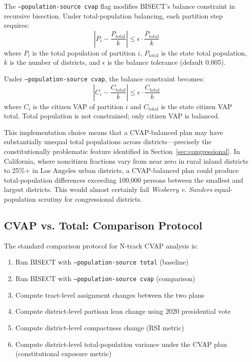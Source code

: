 The \texttt{--population-source cvap} flag modifies BISECT's balance constraint in recursive bisection. Under total-population balancing, each partition step requires:
\[
\left| P_i - \frac{P_{\text{total}}}{k} \right| \leq \epsilon \cdot \frac{P_{\text{total}}}{k}
\]
where $P_i$ is the total population of partition $i$, $P_{\text{total}}$ is the state total population, $k$ is the number of districts, and $\epsilon$ is the balance tolerance (default 0.005).

Under \texttt{--population-source cvap}, the balance constraint becomes:
\[
\left| C_i - \frac{C_{\text{total}}}{k} \right| \leq \epsilon \cdot \frac{C_{\text{total}}}{k}
\]
where $C_i$ is the citizen VAP of partition $i$ and $C_{\text{total}}$ is the state citizen VAP total. Total population is not constrained; only citizen VAP is balanced.

This implementation choice means that a CVAP-balanced plan may have substantially unequal total populations across districts---precisely the constitutionally problematic feature identified in Section~\ref{sec:congressional}. In California, where noncitizen fractions vary from near zero in rural inland districts to 25\%+ in Los Angeles urban districts, a CVAP-balanced plan could produce total-population differences exceeding 100,000 persons between the smallest and largest districts. This would almost certainly fail \emph{Wesberry v. Sanders} equal-population scrutiny for congressional districts.

\subsection{CVAP vs. Total: Comparison Protocol}

The standard comparison protocol for N-track CVAP analysis is:
\begin{enumerate}
    \item Run BISECT with \texttt{--population-source total} (baseline)
    \item Run BISECT with \texttt{--population-source cvap} (comparison)
    \item Compute tract-level assignment changes between the two plans
    \item Compute district-level partisan lean change using 2020 presidential vote
    \item Compute district-level compactness change (RSI metric)
    \item Compute district-level total-population variance under the CVAP plan (constitutional exposure metric)
\end{enumerate}


